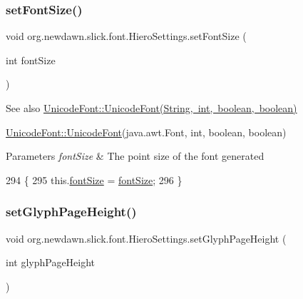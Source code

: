 \subsubsection{\texorpdfstring{set\+Font\+Size()}{setFontSize()}}
{\footnotesize\ttfamily void org.\+newdawn.\+slick.\+font.\+Hiero\+Settings.\+set\+Font\+Size (\begin{DoxyParamCaption}\item[{int}]{font\+Size }\end{DoxyParamCaption})\hspace{0.3cm}{\ttfamily [inline]}}

\begin{DoxySeeAlso}{See also}
\mbox{\hyperlink{classorg_1_1newdawn_1_1slick_1_1_unicode_font_a45cb814b2f8c0ec1e8dbc92c4594b33f}{Unicode\+Font\+::\+Unicode\+Font(\+String, int, boolean, boolean)}} 

\mbox{\hyperlink{classorg_1_1newdawn_1_1slick_1_1_unicode_font_acb84ea3da65e6ac55ce2283bc71e41cf}{Unicode\+Font\+::\+Unicode\+Font}}(java.\+awt.\+Font, int, boolean, boolean)
\end{DoxySeeAlso}

\begin{DoxyParams}{Parameters}
{\em font\+Size} & The point size of the font generated \\
\hline
\end{DoxyParams}

\begin{DoxyCode}
294                                            \{
295         this.\mbox{\hyperlink{classorg_1_1newdawn_1_1slick_1_1font_1_1_hiero_settings_a3e39f423902a5895bd26921a14fe1044}{fontSize}} = \mbox{\hyperlink{classorg_1_1newdawn_1_1slick_1_1font_1_1_hiero_settings_a3e39f423902a5895bd26921a14fe1044}{fontSize}};
296     \}
\end{DoxyCode}
\mbox{\label{classorg_1_1newdawn_1_1slick_1_1font_1_1_hiero_settings_a4135332c3ad3745b61e59f725a44f87c}} 
\subsubsection{\texorpdfstring{set\+Glyph\+Page\+Height()}{setGlyphPageHeight()}}
{\footnotesize\ttfamily void org.\+newdawn.\+slick.\+font.\+Hiero\+Settings.\+set\+Glyph\+Page\+Height (\begin{DoxyParamCaption}\item[{int}]{glyph\+Page\+Height }\end{DoxyParamCaption})\hspace{0.3cm}{\ttfamily [inline]}}

